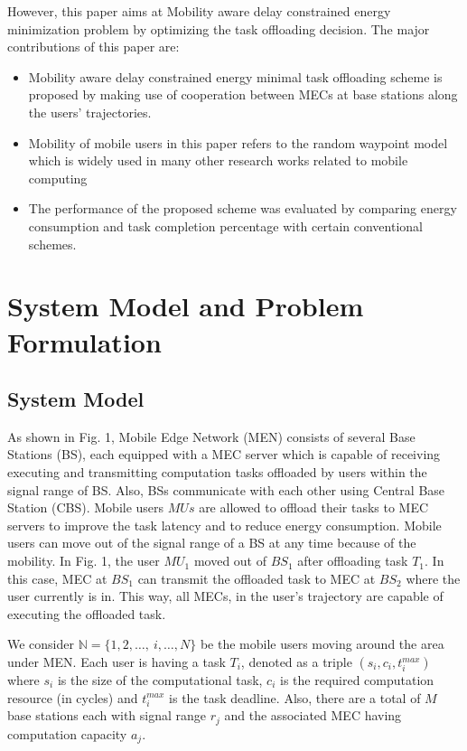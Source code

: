 \documentclass[conference]{IEEEtran}
\begin{document}
	However, this paper aims at Mobility aware delay constrained energy minimization problem by optimizing the task offloading decision. The major contributions of this paper are:
\begin{itemize}
\item Mobility aware delay constrained energy minimal task offloading scheme is proposed by making use of cooperation between MECs at base stations along the users’ trajectories.
\item Mobility of mobile users in this paper refers to the random waypoint model which is widely used in many other research works related to mobile computing
\item The performance of the proposed scheme was evaluated by comparing energy consumption and task completion percentage with certain conventional schemes.
\end{itemize}

\section{System Model and Problem Formulation}
\subsection{System Model}
As shown in Fig. 1, Mobile Edge Network (MEN) consists of several Base Stations (BS), each equipped with a MEC server which is capable of receiving executing and transmitting computation tasks offloaded by users within the signal range of BS. Also, BSs communicate with each other using Central Base Station (CBS). Mobile users $MUs$ are allowed to offload their tasks to MEC servers to improve the task latency and to reduce energy consumption. Mobile users can move out of the signal range of a BS at any time because of the mobility. In Fig. 1, the user $MU_1$ moved out of $BS_1$ after offloading task $T_1$. In this case, MEC at $BS_1$ can transmit the offloaded task to MEC at $BS_2$ where the user currently is in. This way, all MECs, in the user's trajectory are capable of executing the offloaded task. 

  We consider $\mathbb{N}=\{1,2,\dots ,\ i,\dots ,N\}$ be the mobile users moving around the area under MEN. Each user is having a task $T_i$, denoted as a triple $(s_i,c_i,t^{max}_i)$ where $s_i$ is the size of the computational task, $c_i$ is the required computation resource (in cycles) and $t^{max}_i$ is the task deadline.  Also, there are a total of $M$ base stations each with signal range $r_j$ and the associated MEC having computation capacity $a_j$. 
\end{document}
